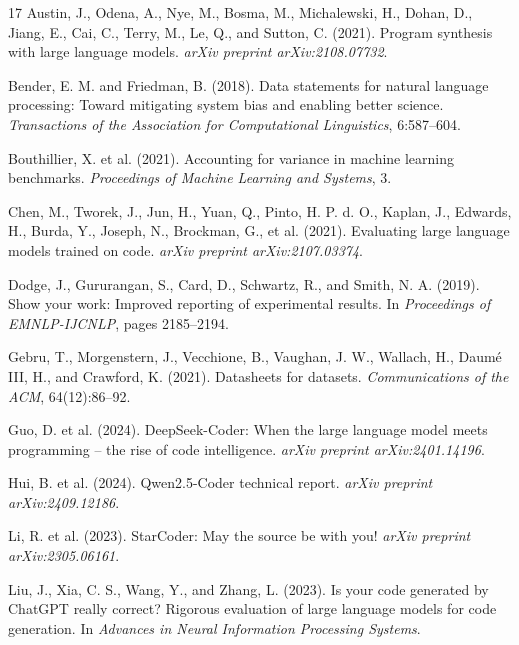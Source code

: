 \documentclass{article}
\begin{document}
\begin{thebibliography}{17}
Austin, J., Odena, A., Nye, M., Bosma, M., Michalewski, H., Dohan, D., Jiang, E., Cai, C., Terry, M., Le, Q., and Sutton, C. (2021).
Program synthesis with large language models.
\emph{arXiv preprint arXiv:2108.07732}.

Bender, E. M. and Friedman, B. (2018).
Data statements for natural language processing: Toward mitigating system bias and enabling better science.
\emph{Transactions of the Association for Computational Linguistics}, 6:587--604.

Bouthillier, X. et al. (2021).
Accounting for variance in machine learning benchmarks.
\emph{Proceedings of Machine Learning and Systems}, 3.

Chen, M., Tworek, J., Jun, H., Yuan, Q., Pinto, H. P. d. O., Kaplan, J., Edwards, H., Burda, Y., Joseph, N., Brockman, G., et al. (2021).
Evaluating large language models trained on code.
\emph{arXiv preprint arXiv:2107.03374}.

Dodge, J., Gururangan, S., Card, D., Schwartz, R., and Smith, N. A. (2019).
Show your work: Improved reporting of experimental results.
In \emph{Proceedings of EMNLP-IJCNLP}, pages 2185--2194.

Gebru, T., Morgenstern, J., Vecchione, B., Vaughan, J. W., Wallach, H., Daum\'e III, H., and Crawford, K. (2021).
Datasheets for datasets.
\emph{Communications of the ACM}, 64(12):86--92.

Guo, D. et al. (2024).
DeepSeek-Coder: When the large language model meets programming -- the rise of code intelligence.
\emph{arXiv preprint arXiv:2401.14196}.

Hui, B. et al. (2024).
Qwen2.5-Coder technical report.
\emph{arXiv preprint arXiv:2409.12186}.

Li, R. et al. (2023).
StarCoder: May the source be with you!
\emph{arXiv preprint arXiv:2305.06161}.

Liu, J., Xia, C. S., Wang, Y., and Zhang, L. (2023).
Is your code generated by ChatGPT really correct? Rigorous evaluation of large language models for code generation.
In \emph{Advances in Neural Information Processing Systems}.


\end{thebibliography}
\end{document}
